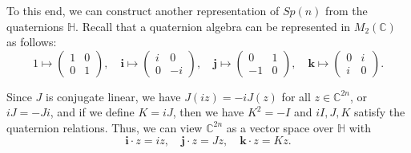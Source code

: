\documentclass[../main.tex]{subfiles}
\begin{document}
To this end, we can construct another representation of $Sp(n)$ from the quaternions $\mathbb{H}$. Recall that a quaternion algebra can be represented in $M_2(\mathbb{C})$ as follows:
\begin{equation*}
	1 \mapsto \begin{pmatrix}
		1 & 0 \\
		0 & 1
	\end{pmatrix}, \quad \boldsymbol{i} \mapsto \begin{pmatrix}
		i & 0  \\
		0 & -i
	\end{pmatrix}, \quad \boldsymbol{j} \mapsto \begin{pmatrix}
		0  & 1 \\
		-1 & 0
	\end{pmatrix}, \quad \boldsymbol{k} \mapsto \begin{pmatrix}
		0 & i \\
		i & 0
	\end{pmatrix}.
\end{equation*}

Since $J$ is conjugate linear, we have $J(i z) = -i J(z)$ for all $z \in \mathbb{C}^{2n}$, or $iJ = -Ji$, and if we define $K = iJ$, then we have $K^2 = -I$ and $iI,J,K$ satisfy the quaternion relations. Thus, we can view $\mathbb{C}^{2n}$ as a vector space over $\mathbb{H}$ with
\begin{equation}
	\boldsymbol{i} \cdot z = i z, \quad \boldsymbol{j} \cdot z = J z, \quad \boldsymbol{k} \cdot z = K z.
\end{equation}
\end{document}

